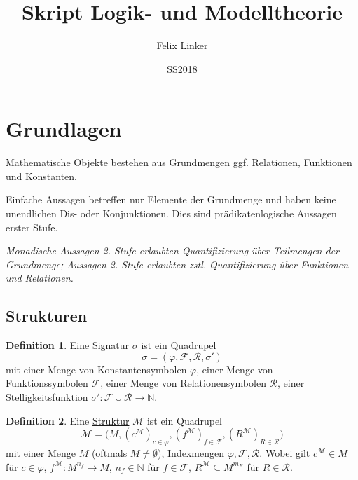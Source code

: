 \documentclass{article}
\title{Skript Logik- und Modelltheorie}
\author{Felix Linker}
\date{SS2018}
\theoremstyle{definition}
\newtheorem{dfn}{Definition}
\newcommand{\calF}{\mathcal{F}}
\newcommand{\calM}{\mathcal{M}}
\newcommand{\calR}{\mathcal{R}}
\begin{document}
    \maketitle

    \section{Grundlagen}

    Mathematische Objekte bestehen aus Grundmengen ggf. Relationen, Funktionen und Konstanten.

    Einfache Aussagen betreffen nur Elemente der Grundmenge und haben keine unendlichen Dis- oder Konjunktionen.
    Dies sind prädikatenlogische Aussagen erster Stufe.

    \textit{Monadische Aussagen 2. Stufe erlaubten Quantifizierung über Teilmengen der Grundmenge; Aussagen 2. Stufe erlaubten zstl. Quantifizierung über Funktionen und Relationen.}

    \subsection{Strukturen}

    \begin{dfn}
        Eine \underline{Signatur} $ \sigma $ ist ein Quadrupel
        \begin{equation}
            \sigma = (\varphi, \calF, \calR, \sigma')
        \end{equation}
        mit einer Menge von Konstantensymbolen $ \varphi $, einer Menge von Funktionssymbolen $ \calF $, einer Menge von Relationensymbolen $ \calR $, einer Stelligkeitsfunktion $ \sigma' : \calF \cup \calR \rightarrow \mathbb{N} $.
    \end{dfn}

    \begin{dfn}
        Eine \underline{Struktur} $ \calM $ ist ein Quadrupel
        \begin{equation}
            \calM = \big(M, (c^\calM)_{c \in \varphi}, (f^\calM)_{f \in \calF}, (R^\calM)_{R \in \calR}\big)
        \end{equation}
        mit einer Menge $ M $ (oftmals $ M \neq \emptyset $), Indexmengen $ \varphi, \calF, \calR $.
        Wobei gilt $ c^\calM \in M $ für $ c \in \varphi $, $ f^\calM : M^{n_f} \rightarrow M $, $ n_f \in \mathbb{N} $ für $ f \in \calF $, $ R^\calM \subseteq M^{m_R} $ für $ R \in \calR $.
    \end{dfn}
\end{document}
